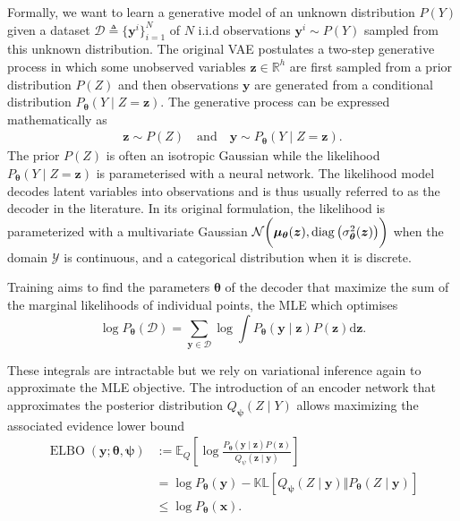 Formally, we want to learn a generative model of an unknown distribution $P(Y)$ given a dataset $\mathcal{D} \triangleq \{\mathbf{y}^i\}^N_{i=1}$ of $N$ i.i.d observations $\mathbf{y}^i \sim P(Y)$ sampled from this unknown distribution.
The original VAE postulates a two-step generative process in which some unobserved variables $\mathbf{z} \in \mathbb{R}^h$ are first sampled from a prior distribution $P(Z)$ and then observations $\mathbf{y}$ are generated from a conditional distribution $P_{\mathbf{\theta}}(Y\mid Z=\mathbf{z})$. The generative process can be expressed mathematically as
\begin{align}
     \mathbf{z} \sim P(Z) \quad \text{and} \quad \mathbf{y} \sim P_{\mathbf{\theta}}(Y\mid Z=\mathbf{z}).
\end{align}
The prior $P(Z)$ is often an isotropic Gaussian while the likelihood $P_{\mathbf{\theta}}(Y\mid Z=\mathbf{z})$ is parameterised with a neural network. The likelihood model decodes latent variables into observations and is thus usually referred to as the decoder in the literature. In its original formulation, the likelihood is parameterized with a multivariate Gaussian $\mathcal{N}\bigg(\mathbf{\mu_{\bm{\theta}}}(\mathbf{z}), \diag\big(\sigma_{\bm{\theta}}^2(\mathbf{z})\big)\bigg)$ when the domain $\mathcal{Y}$ is continuous, and a categorical distribution when it is discrete.

Training aims to find the parameters $\mathbf{\theta}$ of the decoder that maximize the sum of the marginal likelihoods of individual points, the MLE which optimises $$\log P_{\mathbf{\theta}}(\mathcal{D})= \sum_{\mathbf{y}\in \mathcal{D}}\log \int P_{\mathbf{\theta}}(\mathbf{y}\mid \mathbf{z}) P(\mathbf{z}) \text{d}\mathbf{z}.$$

These integrals are intractable but we rely on variational inference again to approximate the MLE objective. The introduction of an encoder network that approximates the posterior distribution $Q_{\bm \psi}(Z\mid Y)$ allows maximizing the associated evidence lower bound
\begin{align}
    \operatorname{ELBO}(\bm{y}; \mathbf{\theta}, \mathbf{\psi})&:=\mathbb{E}_Q\left[\log \frac{P_{\mathbf{\theta}} (\mathbf{y}\mid \mathbf{z}) P(\mathbf{z})}{Q_\psi(\mathbf{z}\mid \mathbf{y})} \right]\label{eq:ELBO_VAE}\\
    &=\log P_{\mathbf{\theta}}(\mathbf{y}) - \mathbb{KL}\left[Q_{\bm \psi}(Z\mid \mathbf{y})\Vert P_{\mathbf{\theta}} (Z\mid \mathbf{y})\right]\\
    &\leq \log P_{\mathbf{\theta}}(\mathbf{x}).
\end{align}

